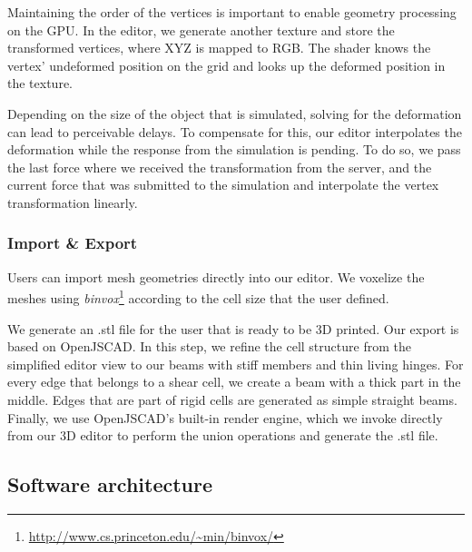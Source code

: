Maintaining the order of the vertices is important to enable geometry processing on the GPU. In the editor, we generate another texture and store the transformed vertices, where XYZ is mapped to RGB. The shader knows the vertex' undeformed position on the grid and looks up the deformed position in the texture.

Depending on the size of the object that is simulated, solving for the deformation can lead to perceivable delays. To compensate for this, our editor interpolates the deformation while the response from the simulation is pending. To do so, we pass the last force where we received the transformation from the server, and the current force that was submitted to the simulation and interpolate the vertex transformation linearly.

\subsubsection{Import \& Export}

Users can import mesh geometries directly into our editor. We voxelize the meshes using \textit{binvox}\footnote{\url{http://www.cs.princeton.edu/~min/binvox/}}  according to the cell size that the user defined.

We generate an .stl file for the user that is ready to be 3D printed. Our export is based on OpenJSCAD. In this step, we refine the cell structure from the simplified editor view to our beams with stiff members and thin living hinges. For every edge that belongs to a shear cell, we create a beam with a thick part in the middle. Edges that are part of rigid cells are generated as simple straight beams. Finally, we use OpenJSCAD's built-in render engine, which we invoke directly from our 3D editor to perform the union operations and generate the .stl file.


\subsection{Software architecture}



